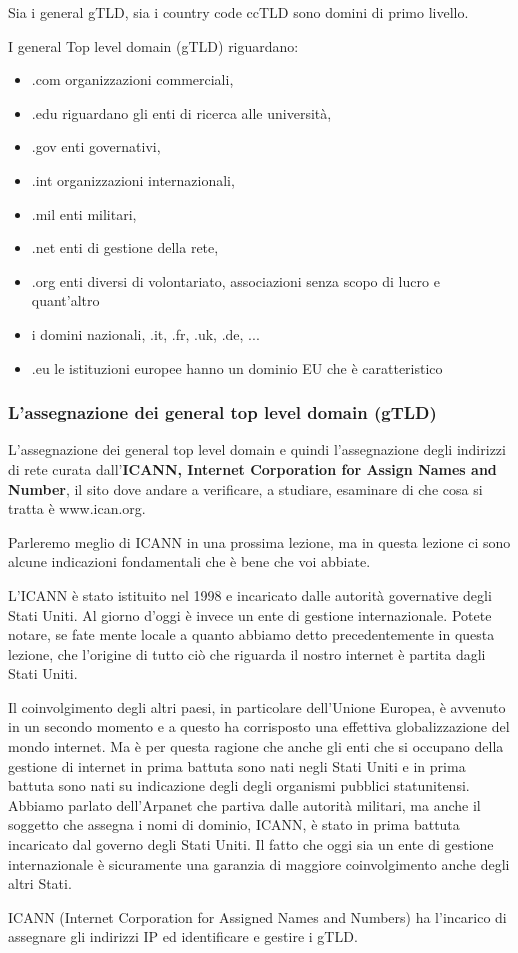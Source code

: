  Sia i general gTLD, sia i country code ccTLD sono domini di primo livello. \par

I general Top level domain (gTLD) riguardano:
\begin{itemize}
    \item .com organizzazioni commerciali, 
    \item .edu riguardano gli enti di ricerca alle università, 
    \item .gov enti governativi, 
    \item .int organizzazioni internazionali, 
    \item .mil enti militari, 
    \item .net enti di gestione della rete, 
    \item .org enti diversi di volontariato, associazioni senza scopo di lucro e quant'altro
    \item i domini nazionali, .it, .fr, .uk, .de, ...
    \item .eu le istituzioni europee hanno un dominio EU che è caratteristico
\end{itemize}

\subsubsection{L'assegnazione dei general top level domain (gTLD)}

 L'assegnazione dei general top level domain e quindi l'assegnazione degli indirizzi di rete curata dall'\textbf{ICANN, Internet Corporation for Assign Names and Number}, il sito dove andare a verificare, a studiare, esaminare di che cosa si tratta è www.ican.org. \par
 Parleremo meglio di ICANN in una prossima lezione, ma in questa lezione ci sono alcune indicazioni fondamentali che è bene che voi abbiate.\par 
 L'ICANN è stato istituito nel 1998 e incaricato dalle autorità governative degli Stati Uniti. Al giorno d'oggi è invece un ente di gestione internazionale. Potete notare, se fate mente locale a quanto abbiamo detto precedentemente in questa lezione, che l'origine di tutto ciò che riguarda il nostro internet è partita dagli Stati Uniti.\par
 Il coinvolgimento degli altri paesi, in particolare dell'Unione Europea, è avvenuto in un secondo momento e a questo ha corrisposto una effettiva globalizzazione del mondo internet. Ma è per questa ragione che anche gli enti che si occupano della gestione di internet in prima battuta sono nati negli Stati Uniti e in prima battuta sono nati su indicazione degli degli organismi pubblici statunitensi. Abbiamo parlato dell'Arpanet che partiva dalle autorità militari, ma anche il soggetto che assegna i nomi di dominio, ICANN, è stato in prima battuta incaricato dal governo degli Stati Uniti. Il fatto che oggi sia un ente di gestione internazionale è sicuramente una garanzia di maggiore coinvolgimento anche degli altri Stati.\par
 ICANN (Internet Corporation for Assigned Names and Numbers) ha l'incarico di assegnare gli indirizzi IP ed identificare e gestire i gTLD. 
